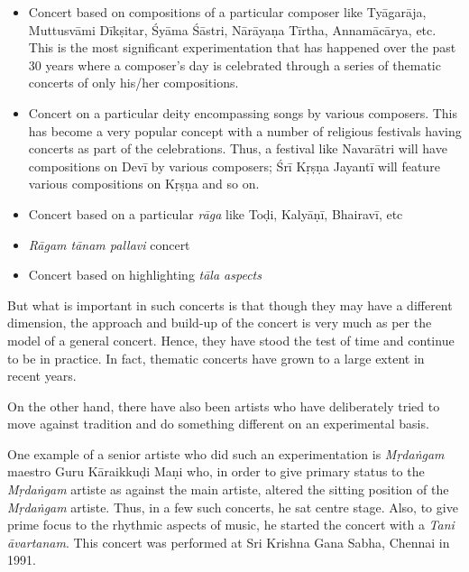 \begin{itemize}
\itemsep=0pt

 \item Concert based on compositions of a particular composer like Tyāgarāja, Muttusvāmi Dīkṣitar, Śyāma Śāstri, Nārāyaṇa Tīrtha, Annamācārya, etc. This is the most significant experimentation that has happened over the past 30 years where a composer’s day is celebrated through a series of thematic concerts of only his/her compositions.

 \item Concert on a particular deity encompassing songs by various composers. This has become a very popular concept with a number of religious festivals having concerts as part of the celebrations. Thus, a festival like Navarātri will have compositions on Devī by various composers; Śrī Kṛṣṇa Jayantī will feature various compositions on Kṛṣṇa and so on.

 \item Concert based on a particular \textit{rāga} like Toḍi, Kalyāṇī, Bhairavī, etc

 \item \textit{Rāgam tānam pallavi} concert

 \item Concert based on highlighting \textit{tāla aspects}

\end{itemize}

But what is important in such concerts is that though they may have a different dimension, the approach and build-up of the concert is very much as per the model of a general concert. Hence, they have stood the test of time and continue to be in practice. In fact, thematic concerts have grown to a large extent in recent years.

On the other hand, there have also been artists who have deliberately tried to move against tradition and do something different on an experimental basis.

One example of a senior artiste who did such an experimentation is \textit{Mṛdaṅgam} maestro Guru Kāraikkuḍi Maṇi who, in order to give primary status to the \textit{Mṛdaṅgam} artiste as against the main artiste, altered the sitting position of the \textit{Mṛdaṅgam} artiste. Thus, in a few such concerts, he sat centre stage. Also, to give prime focus to the rhythmic aspects of music, he started the concert with a \textit{Tani āvartanam}. This concert was performed at Sri Krishna Gana Sabha, Chennai in 1991.

